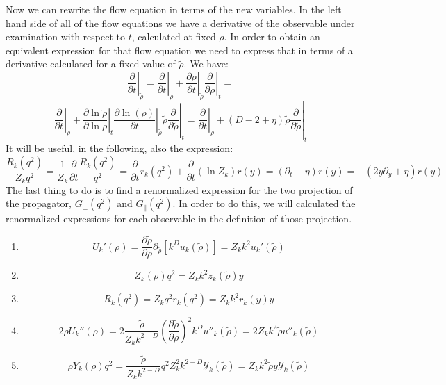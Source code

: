 Now we can rewrite the flow equation in terms of the new variables. 
In the left hand side of all of the flow equations we have a derivative of the observable under examination with respect to $t$, calculated at fixed $\rho$. In order to obtain
an equivalent expression for that flow equation we need to express that in terms of a derivative calculated for a fixed value of $\widetilde{\rho}$.
We have:
\begin{equation*}
 \left. \frac{\partial}{\partial t} \right|_{\widetilde{\rho}} = \left. \frac{\partial}{\partial t} \right|_\rho + \left. \frac{\partial\rho}{\partial t} \right|_{\widetilde{\rho}}\left.\frac{\partial}{\partial\rho}\right|_t =
\end{equation*}
\begin{equation*}
\left.\left. \frac{\partial}{\partial t} \right|_\rho + \left.\left.\frac{\partial\ln{\widetilde{\rho}}}{\partial\ln{\rho}}\right|_t\left.\frac{\partial\ln(\rho)}{\partial t}\right|_{\widetilde{\rho}}\widetilde{\rho}\frac{\partial}{\partial\widetilde{\rho}}\right|_t =  \left. \frac{\partial}{\partial t} \right|_{\rho} + (D- 2 + \eta)\widetilde{\rho}\frac{\partial}{\partial\widetilde{\rho}}\right|_t
\end{equation*}
It will be useful, in the following, also the expression:
\begin{equation}
\frac{\dot{R}_k(q^2)}{Z_k q^2} =  \frac{1}{Z_k}\frac{\partial}{\partial t} \frac{R_k(q^2)}{q^2} = \frac{\partial}{\partial t} r_k(q^2) +\frac{\partial}{\partial t}(\ln Z_k)r(y) =  (\partial_t - \eta) r(y) =  -(2y\partial_y + \eta) r(y)
\end{equation}
The last thing to do is to find a renormalized expression for the two projection of the propagator, $G_\perp(q^2)$ and $G_\parallel(q^2)$.
In order to do this, we will calculated the renormalized expressions for each observable in the definition of those projection.
\begin{enumerate}
 \item $$U_k'(\rho) = \frac{\partial \widetilde{\rho}}{\partial \rho}\partial_{\widetilde{\rho}}[k^Du_k(\widetilde{\rho})] = Z_kk^2u_k'(\widetilde{\rho})$$
 \item $$Z_k(\rho)q^2 = Z_kk^2z_k(\widetilde{\rho})y$$
 \item $$R_k(q^2) = Z_kq^2r_k(q^2) = Z_kk^2r_k(y)y$$
 \item $$2\rho U_k''(\rho) = 2\frac{\widetilde{\rho}}{Z_k k^{2-D}}\left(\frac{\partial\widetilde{\rho}}{\partial{\rho}}\right)^2k^Du''_k(\widetilde{\rho}) = 2Z_kk^2\widetilde{\rho}u''_k(\widetilde{\rho})$$
 \item $$\rho Y_k(\rho)q^2 = \frac{\widetilde{\rho}}{Z_kk^{2-D}}q^2Z_k^2k^{2-D}\mathcal{Y}_k(\widetilde{\rho}) = Z_kk^2\widetilde{\rho}y\mathcal{Y}_k(\widetilde{\rho})$$
\end{enumerate}
